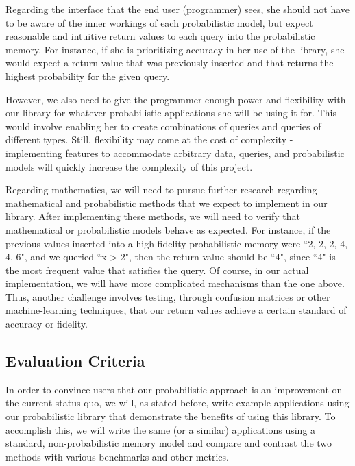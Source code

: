 \documentclass{sig-alternate}
\begin{document}
Regarding the interface that the end user (programmer) sees, she should not have to be aware of 
the inner workings of each probabilistic model, but expect reasonable and intuitive return values
to each query into the probabilistic memory. For instance, if she is prioritizing accuracy 
in her use of the library, she would expect a return value that was previously inserted and that 
returns the highest probability for the given query.

However, we also need to give the programmer enough power and flexibility with our library for 
whatever probabilistic applications she will be using it for. This would involve enabling 
her to create combinations of queries and queries of different types. Still, flexibility may 
come at the cost of complexity - implementing features to accommodate arbitrary data, queries,
and probabilistic models will quickly increase the complexity of this project. 

Regarding mathematics, we will need to pursue further research regarding mathematical 
and probabilistic methods that we expect to implement in our library. After implementing these methods,
we will need to verify that mathematical or probabilistic models behave as expected. 
For instance, if the previous values inserted into a high-fidelity probabilistic memory were ``2, 2, 2, 4, 4, 6", and we queried ``x > 2", 
then the return value should be ``4", since ``4" is the most frequent value that satisfies the query.
Of course, in our actual implementation, we will have more complicated mechanisms than the one above.
Thus, another challenge involves testing, through confusion matrices or other machine-learning techniques,
that our return values achieve a certain standard of accuracy or fidelity.


\subsection{Evaluation Criteria}
\label{subsec:eval_criteria}
In order to convince users that our probabilistic approach is an improvement on the
current status quo, we will, as stated before, write example applications using our 
probabilistic library that demonstrate the benefits of using this library. To accomplish 
this, we will write the same (or a similar) applications using a standard, non-probabilistic memory model
and compare and contrast the two methods with various benchmarks and other metrics.
\end{document}
